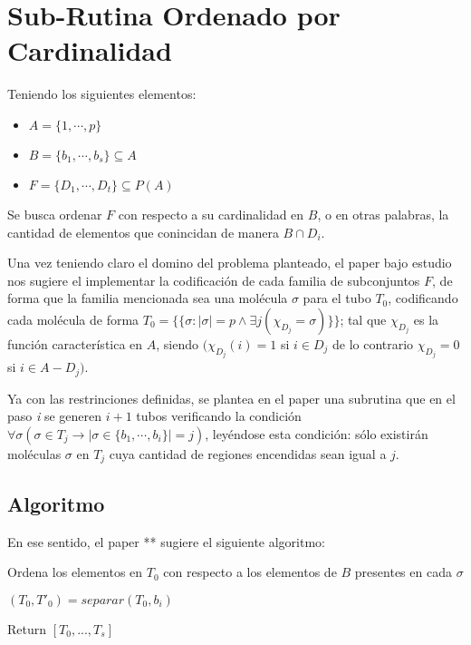 \documentclass[12pt, letterpaper, twoside]{article}
\begin{document}
    \section{Sub-Rutina Ordenado por Cardinalidad}
    \par Teniendo los siguientes elementos:
    \begin{itemize}
        \item $A = \{1,\cdots,p\}$
        \item $B = \{b_1,\cdots,b_s\} \subseteq A$ 
        \item $F = \{D_1,\cdots,D_t\} \subseteq P(A)$ 
    \end{itemize}
    \par Se busca ordenar $F$ con respecto a su cardinalidad en $B$, o en otras palabras, la cantidad de elementos que conincidan de manera $B\cap D_i$.
    \par Una vez teniendo claro el domino del problema planteado, el paper bajo estudio nos sugiere el implementar la codificación de cada familia de subconjuntos $F$, de forma que la familia mencionada sea una molécula $\sigma$ para el tubo $T_0$, codificando cada molécula de forma $T_0=\{\{\sigma:|\sigma|=p \land \exists j(\chi_{D_j}=\sigma)\}\}$; tal que $\chi_{D_j}$ es la función característica en $A$, siendo $(\chi_{D_j}(i) = 1$ si $i \in D_j$ de lo contrario $\chi_{D_j} = 0$ si $i \in A - D_j)$.
    \par Ya con las restrinciones definidas, se plantea en el paper una subrutina que en el paso \emph{i} se generen $i + 1$ tubos verificando la condición $\forall\sigma(\sigma\in T_j \rightarrow|\sigma\in\{b_1,\cdots,b_i\}|=j)$, leyéndose esta condición: sólo existirán moléculas $\sigma$ en $T_j$ cuya cantidad de regiones encendidas sean igual a $j$.
    \subsection{Algoritmo}
    \par En ese sentido, el paper ** sugiere el siguiente algoritmo:
    \begin{algorithm}
        \caption{Ordena los elementos en $T_0$ con respecto a los elementos de $B$ presentes en cada $\sigma$}
        \label{CardinalSort}
        \begin{algorithmic}[1]
            \State $(T_0, T'_0) = separar(T_0, b_i)$
            
            \EndFor
            \EndFor
            \State Return $[T_0,...,T_s]$
            \EndProcedure
        \end{algorithmic}
    \end{algorithm}
    
\end{document}
